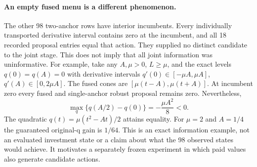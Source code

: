 \paragraph{An empty fused menu is a different phenomenon.}
The other 98 two-anchor rows have interior incumbents. Every individually
transported derivative interval contains zero at the incumbent, and all
18 recorded proposal entries equal that action. They supplied no distinct
candidate to the joint stage. This does not imply that all joint information
was uninformative. For example, take any $A,\mu>0$, $L\ge\mu$, and the
exact levels $q(0)=q(A)=0$ with derivative intervals
$q'(0)\in[-\mu A,\mu A]$, $q'(A)\in[0,2\mu A]$.
The fused cones are $[\mu(t-A),\mu(t+A)]$. At incumbent zero every
fused and single-anchor robust proposal remains zero. Nevertheless,
\begin{equation}\label{eq:menustarvation124}
 \max_q\{q(A/2)-q(0)\}=-\frac{\mu A^2}{8}<0.
\end{equation}
The quadratic $q(t)=\mu(t^2-At)/2$ attains equality. For $\mu=2$ and
$A=1/4$ the guaranteed original-q gain is $1/64$. This is an exact
information example, not an evaluated investment state or a claim about
what the 98 observed states would achieve. It motivates a separately
frozen experiment in which paid values also generate candidate actions.
